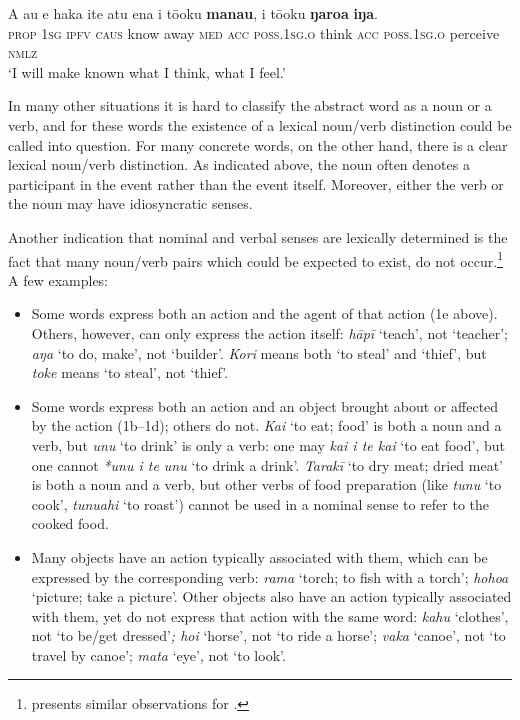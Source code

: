 \ea\label{ex:3.14}
\gll A au e haka {\ꞌ}ite atu ena i tō{\ꞌ}oku \textbf{mana{\ꞌ}u}, i tō{\ꞌ}oku  \textbf{ŋaro{\ꞌ}a} \textbf{iŋa}.\\
\textsc{prop} \textsc{1sg} \textsc{ipfv} \textsc{caus} know away \textsc{med} \textsc{acc} \textsc{poss.1sg.o} think \textsc{acc} \textsc{poss.1sg.o}  perceive \textsc{nmlz}\\

\glt
‘I will make known what I think, what I feel.’ \textstyleExampleref{[R443.013–015]}
\z

In many other situations it is hard to classify the abstract word as a noun or a verb, and for these words the existence of a lexical noun/verb distinction could be called into question. For many concrete words, on the other hand, there is a clear lexical noun/verb distinction. As indicated above, the noun often denotes a participant in the event rather than the event itself. Moreover, either the verb or the noun may have idiosyncratic senses.

\largerpage
Another indication that nominal and verbal senses are lexically determined is the fact that many noun/verb pairs which could be expected to exist, do not occur.\footnote{\label{fn:102}\citet{Clark1983Maori} presents similar observations for .} A few examples:

\begin{itemize}
\item 
Some words express both an action and the agent of that action (1e above). Others, however, can only express the action itself: \textit{hāpī} ‘teach’, not ‘teacher’; \textit{aŋa} ‘to do, make’, not ‘builder’. \textit{Kori} means both ‘to steal’ and ‘thief’, but \textit{toke} means ‘to steal’, not ‘thief’.

\item 
Some words express both an action and an object brought about or affected by the action (1b–1d); others do not. \textit{Kai} ‘to eat; food’ is both a noun and a verb, but \textit{unu} ‘to drink’ is only a verb: one may \textit{kai i te kai} ‘to eat food’, but one cannot \textit{*unu i te unu} ‘to drink a drink’. \textit{Tarakī} ‘to dry meat; dried meat’ is both a noun and a verb, but other verbs of food preparation (like \textit{tunu} ‘to cook’, \textit{tunuahi} ‘to roast’) cannot be used in a nominal sense to refer to the cooked food.

\item 
Many objects have an action typically associated with them, which can be expressed by the corresponding verb: \textit{rama} ‘torch; to fish with a torch’; \textit{hoho{\ꞌ}a} ‘picture; take a picture’. Other objects also have an action typically associated with them, yet do not express that action with the same word: \textit{kahu} ‘clothes’, not ‘to be/get dressed’\textit{; hoi} ‘horse’, not ‘to ride a horse’; \textit{vaka} ‘canoe’, not ‘to travel by canoe’; \textit{mata} ‘eye’, not ‘to look’.

\end{itemize}


